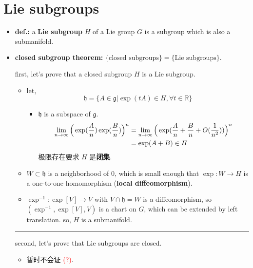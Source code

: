 \section{Lie subgroups}
\begin{itemize}
	\item \textbf{def.:} a \textbf{Lie subgroup} $H$ of a Lie group $G$ is a subgroup which is also a submanifold.
	
	\item \textbf{closed subgroup theorem:} $\{\text{closed subgroups}\} = \{\text{Lie subgroups}\}$.
	
	\begin{tcolorbox}[title=proof:]
		first, let's prove that a closed subgroup $H$ is a Lie subgroup.
		\begin{itemize}
			\item let,
			\begin{equation}
				\mathfrak{h} = \{A \in \mathfrak{g} | \exp(t A) \in H, \forall t \in \mathbb{R}\}
			\end{equation}
			\begin{itemize}
				\item $\mathfrak{h}$ is a subspace of $\mathfrak{g}$.
				\begin{align}
					\lim_{n \rightarrow \infty} \Big( \exp(\frac{A}{n}) \exp(\frac{B}{n}) \Big)^n &= \lim_{n \rightarrow \infty} \Big( \exp(\frac{A}{n} + \frac{B}{n} + O(\frac{1}{n^2})) \Big)^n \notag \\
					&= \exp(A + B) \in H
				\end{align}
				极限存在要求 $H$ 是\textbf{闭集}.
			\end{itemize}
			
			\item $W \subset \mathfrak{h}$ is a neighborhood of $0$, which is small enough that $\exp : W \rightarrow H$ is a one-to-one homomorphism (\textbf{local diffeomorphism}).
			
			\item $\exp^{- 1} : \exp[V] \rightarrow V$ with $V \cap \mathfrak{h} = W$ is a diffeomorphism, so $(\exp^{- 1}, \exp[V], V)$ is a chart on $G$, which can be extended by left translation. so, $H$ is a submanifold.
		\end{itemize}
		
		\noindent\rule[0.5ex]{\linewidth}{0.5pt} %
		
		second, let's prove that Lie subgroups are closed.
		\begin{itemize}
			\item 暂时不会证 \textcolor{red}{(?)}.
		\end{itemize}
	\end{tcolorbox}
\end{itemize}
